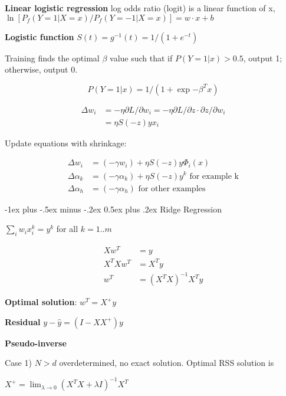 \documentclass[9pt,landscape]{extarticle}
\makeatletter
\renewcommand{\section}{\@startsection{section}{1}{0mm}%
                                {-1ex plus -.5ex minus -.2ex}%
                                {0.5ex plus .2ex}%
                                {\normalfont\normalsize\bfseries}}
\makeatother
\begin{document}
\begin{multicols}{3}
\textbf{Linear logistic regression} log odds ratio (logit) is a linear function of x, $\ln [P_f (Y=1 | X=x) / P_f (Y=-1 | X=x)] = w \cdot x + b$

\textbf{Logistic function} $S(t) = g^{-1}(t) = 1 / (1+e^{-t})$

Training finds the optimal $\beta$ value such that if $P(Y=1 | x) > 0.5$, output 1; otherwise, output 0.

\begin{equation}
P(Y=1 | x) = 1 / (1 + \exp{-\beta^T x})
\end{equation}

\begin{align*}
\Delta w_i &= -\eta \partial L  / \partial w_i 
= -\eta \partial L / \partial z \cdot \partial z / \partial w_i \\
&= \eta S(-z) y x_i
\end{align*}

Update equations with shrinkage:

\begin{align*}
\Delta w_i &= (-\gamma w_i) + \eta S(-z) y \Phi_i (x) \\
\Delta \alpha_k &= (-\gamma \alpha_k) + \eta S(-z) y^k \text{ for example k} \\
\Delta \alpha_h &= (-\gamma \alpha_h) \text{ for other examples}
\end{align*}


\section{Ridge Regression}

$\sum_i w_i x^k_i = y^k$ for all $k=1..m$

\begin{align*}
Xw^T &= y \\
X^T X w^T &= X^T y \\
w^T &= (X^T X)^{-1} X^T y
\end{align*}

\textbf{Optimal solution}: $w^T = X^+ y$

\textbf{Residual} $y-\hat{y} = (I-XX^+)y$

\textbf{Pseudo-inverse}

Case 1) $N > d$ overdetermined, no exact solution. Optimal RSS solution is

$X^+ = \lim_{\lambda \rightarrow 0} (X^T X + \lambda I)^{-1} X^T$


\end{multicols}
\end{document}
